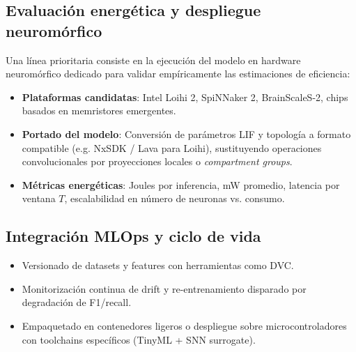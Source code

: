 \subsection{Evaluación energética y despliegue neuromórfico}
\label{subsec:trabajo-futuro-neuromorfico}
Una línea prioritaria consiste en la ejecución del modelo en hardware neuromórfico dedicado para validar empíricamente las estimaciones de eficiencia:
\begin{itemize}
    \item \textbf{Plataformas candidatas}: Intel Loihi 2, SpiNNaker 2, BrainScaleS-2, chips basados en memristores emergentes.
    \item \textbf{Portado del modelo}: Conversión de parámetros LIF y topología a formato compatible (e.g. NxSDK / Lava para Loihi), sustituyendo operaciones convolucionales por proyecciones locales o \textit{compartment groups}.
    \item \textbf{Métricas energéticas}: Joules por inferencia, mW promedio, latencia por ventana \(T\), escalabilidad en número de neuronas vs. consumo.
\end{itemize}

\subsection{Integración MLOps y ciclo de vida}
\begin{itemize}
    \item Versionado de datasets y features con herramientas como DVC.
    \item Monitorización continua de drift y re-entrenamiento disparado por degradación de F1/recall.
    \item Empaquetado en contenedores ligeros o despliegue sobre microcontroladores con toolchains específicos (TinyML + SNN surrogate).
\end{itemize}

